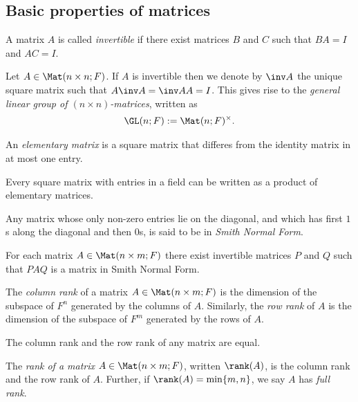 \documentclass{article}
\begin{document}
\subsection{Basic properties of matrices}

\begin{definition}
    A matrix $A$ is called \emph{invertible} if there exist matrices $B$ and $C$
    such that $BA=I$ and $AC=I$.
\end{definition}

\begin{definition}
    Let $A\in\Mat(n\times n;F)$. If $A$ is invertible then we denote by $\inv A$
    the unique square matrix such that $A\inv A=\inv AA=I$. This gives rise to the
    \emph{general linear group of $(n\times n)$-matrices}, written as
    \begin{align*}
        \GL(n;F) := \Mat(n;F)^\times.
    \end{align*}
\end{definition}

\begin{definition}
    An \emph{elementary matrix} is a square matrix that differes from the identity
    matrix in at most one entry.
\end{definition}

\begin{theorem}[Notes 2.2.3]
    Every square matrix with entries in a field can be written as a product of
    elementary matrices.
\end{theorem}

\begin{definition}
    Any matrix whose only non-zero entries lie on the diagonal, and which has
    first $1$s along the diagonal and then $0$s, is said to be in \emph{Smith Normal Form}.
\end{definition}

\begin{theorem}[Notes 2.2.5]
    For each matrix $A\in\Mat(n\times m;F)$ there exist invertible matrices $P$
    and $Q$ such that $PAQ$ is a matrix in Smith Normal Form.
\end{theorem}

\begin{definition}
    The \emph{column rank} of a matrix $A\in\Mat(n\times m;F)$ is the dimension of
    the subspace of $F^n$ generated by the columns of $A$. Similarly, the \emph{row
        rank} of $A$ is the dimension of the subspace of $F^m$ generated by the rows
    of $A$.
\end{definition}

\begin{theorem}[Notes 2.2.8]
    The column rank and the row rank of any matrix are equal.
\end{theorem}

\begin{definition}
    The \emph{rank of a matrix} $A\in\Mat(n\times m;F)$, written $\rank(A)$, is the column rank and the
    row rank of $A$. Further, if $\rank(A) = \min\{m,n\}$, we say $A$ has
    \emph{full rank}.
\end{definition}
\end{document}
